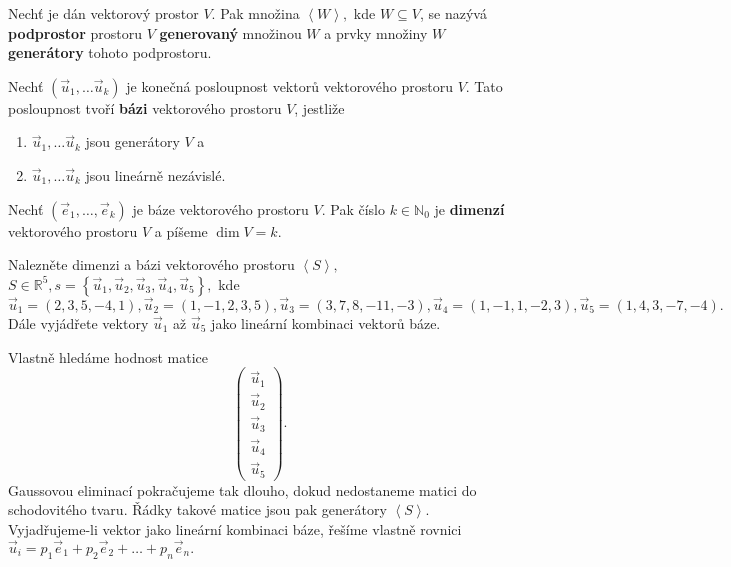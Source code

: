\begin{definition}
    Nechť je dán vektorový prostor $V$. Pak množina $\left < W \right >,$ kde $
    W\subseteq V$, se nazývá \textbf{podprostor} prostoru $V$ \textbf{generovaný}
    množinou $W$ a prvky množiny $W$ \textbf{generátory} tohoto podprostoru.
\end{definition}

\begin{definition}
    Nechť $(\vec u_1, \dots \vec u_k)$ je konečná posloupnost vektorů vektorového
    prostoru $V$. Tato posloupnost tvoří \textbf{bázi} vektorového prostoru $V$, jestliže
    \begin{enumerate}[$i.$]
    \item $\vec u_1, \dots \vec u_k$ jsou generátory $V$ a
   	\item $\vec u_1, \dots \vec u_k$ jsou lineárně nezávislé.
    \end{enumerate}
\end{definition}

\begin{definition}
Nechť $(\vec e_1,\dots, \vec e_k)$ je báze vektorového prostoru $V$. Pak číslo $k \in
\mathbb N_0$ je \textbf{dimenzí} vektorového prostoru $V$ a píšeme $\dim V=k$.
\end{definition}

\begin{priklad}
Nalezněte dimenzi a bázi vektorového prostoru $\left < S \right > ,$
$S \in \mathbb R^{5}, s = \left \{ \vec u_1,\vec u_2,\vec u_3,\vec u_4,\vec u_5 \right \}, $
kde $\vec u_1=(2,3,5,-4,1),\vec u_2=(1,-1,2,3,5),\vec u_3=(3,7,8,-11,-3),\vec u_4=(1,-1,1,-2,3),\vec u_5=(1,4,3,-7,-4).$
Dále vyjádřete vektory $\vec u_1$ až $\vec u_5$ jako lineární kombinaci vektorů báze.
\end{priklad}

\begin{reseni}
Vlastně hledáme hodnost matice
$$
\begin{pmatrix}
    \vec u_1\\
   \vec u_2\\
  \vec u_3\\
 \vec u_4\\
\vec u_5
\end{pmatrix}.
$$
Gaussovou eliminací pokračujeme tak dlouho, dokud nedostaneme matici do schodovitého tvaru.
Řádky takové matice jsou pak generátory $\left < S \right > .$
Vyjadřujeme-li vektor jako lineární kombinaci báze, řešíme vlastně rovnici
$\vec u_i = p_1\vec e_1 + p_2\vec e_2 +\dots + p_n\vec e_n.$
\end{reseni}

